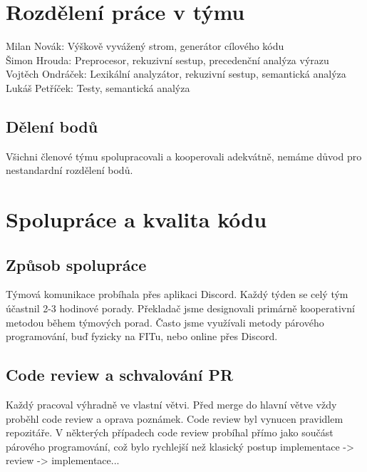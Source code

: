 \documentclass[a4paper,11pt]{article}
\begin{document}
\section{Rozdělení práce v týmu}
\label{sec:prace}
Milan Novák: Výškově vyvážený strom, generátor cílového kódu\\
Šimon Hrouda: Preprocesor, rekuzivní sestup, precedenční analýza výrazu\\
Vojtěch Ondráček: Lexikální analyzátor, rekuzivní sestup, semantická analýza\\
Lukáš Petříček: Testy, semantická analýza

\subsection{Dělení bodů}
Všichni členové týmu spolupracovali a kooperovali adekvátně, nemáme důvod pro nestandardní rozdělení bodů.

\section{Spolupráce a kvalita kódu}
\label{sec:spoluprace}

\subsection{Způsob spolupráce}
Týmová komunikace probíhala přes aplikaci Discord. Každý týden se celý tým účastnil 2-3 hodinové porady. Překladač jsme designovali primárně kooperativní metodou během týmových porad. Často jsme využívali metody párového programování, buď fyzicky na FITu, nebo online přes    Discord.

\subsection{Code review a schvalování PR}
Každý pracoval výhradně ve vlastní větvi. Před merge do hlavní větve vždy proběhl code review a oprava poznámek. Code review byl vynucen pravidlem repozitáře. V některých případech code review probíhal přímo jako součást párového programování, což bylo rychlejší než klasický postup implementace -> review -> implementace...
\end{document}

